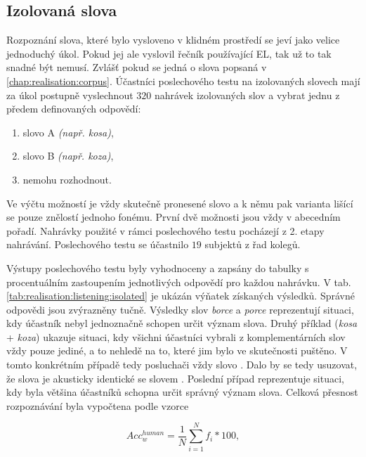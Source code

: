 \subsection{Izolovaná slova}
\label{chap:realisation:listening:isolated}

Rozpoznání slova, které bylo vysloveno v klidném prostředí se jeví jako velice jednoduchý úkol.
Pokud jej ale vyslovil řečník používající EL, tak už to tak snadné být nemusí.
Zvlášť pokud se jedná o slova popsaná v \ref{chap:realisation:corpus}.
Účastníci poslechového testu na izolovaných slovech mají za úkol postupně vyslechnout $320$ nahrávek izolovaných slov a vybrat jednu z předem definovaných odpovědí:

\begin{enumerate}[label=\alph*)]
  \item slovo A \textit{(např. kosa)},
  \item slovo B \textit{(např. koza)},
  \item nemohu rozhodnout.
\end{enumerate}

\noindent Ve výčtu možností je vždy skutečně pronesené slovo a k němu pak varianta lišící se pouze znělostí jednoho fonému. První dvě možnosti jsou vždy v abecedním pořadí. Nahrávky použité v rámci poslechového testu pocházejí z 2. etapy nahrávání. Poslechového testu se účastnilo $19$ subjektů z řad kolegů.

Výstupy poslechového testu byly vyhodnoceny a zapsány do tabulky s procentuálním zastoupením jednotlivých odpovědí pro každou nahrávku.
V tab. \ref{tab:realisation:listening:isolated} je ukázán výňatek získaných výsledků. Správné odpovědi jsou zvýrazněny tučně.
Výsledky slov \textit{borce} a \textit{porce} reprezentují situaci, kdy účastník nebyl jednoznačně schopen určit význam slova.
Druhý příklad (\textit{kosa} + \textit{koza}) ukazuje situaci, kdy všichni účastníci vybrali z komplementárních slov vždy pouze jediné, a to nehledě na to, které jim bylo ve skutečnosti puštěno.
V tomto konkrétním případě tedy posluchači vždy  slovo .
Dalo by se tedy usuzovat, že slova  je akusticky identické se slovem .
Poslední případ reprezentuje situaci, kdy byla většina účastníků schopna určit správný význam slova.
Celková přesnost rozpoznávání byla vypočtena podle vzorce

\begin{equation}
  Acc_w^{human} = \frac{1}{N} \sum_{i=1}^{N} f_i * 100,
  \label{eq:realisation:accuracy:human}
\end{equation}

